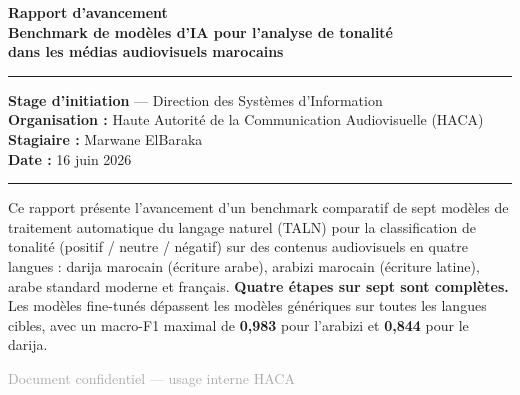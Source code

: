 \documentclass[12pt, a4paper]{article}
\begin{document}
\begin{titlepage}
  \centering
  \vspace*{1.5cm}

  {\LARGE\bfseries\color{hacablue}
    Rapport d'avancement\\[0.4em]
    \large Benchmark de modèles d'IA pour l'analyse de tonalité\\
    dans les médias audiovisuels marocains
  }\par

  \vspace{1.2cm}
  \rule{0.6\linewidth}{1pt}\par
  \vspace{0.6cm}

  {\large
    \textbf{Stage d'initiation} — Direction des Systèmes d'Information\\[0.3em]
    \textbf{Organisation :} Haute Autorité de la Communication Audiovisuelle (HACA)\\[0.3em]
    \textbf{Stagiaire :} Marwane ElBaraka\\[0.3em]
    \textbf{Date :} 16 juin 2026
  }\par

  \vspace{1.2cm}
  \rule{0.6\linewidth}{1pt}\par
  \vspace{1.5cm}

  \begin{infobox}
    Ce rapport présente l'avancement d'un benchmark comparatif de sept modèles
    de traitement automatique du langage naturel (TALN) pour la classification
    de tonalité (positif / neutre / négatif) sur des contenus audiovisuels en
    quatre langues : darija marocain (écriture arabe), arabizi marocain (écriture
    latine), arabe standard moderne et français. \textbf{Quatre étapes sur sept
    sont complètes.} Les modèles fine-tunés dépassent les modèles génériques sur
    toutes les langues cibles, avec un macro-F1 maximal de \textbf{0{,}983} pour
    l'arabizi et \textbf{0{,}844} pour le darija.
  \end{infobox}

  \vfill
  {\small\textcolor{darkgray}{Document confidentiel — usage interne HACA}}
\end{titlepage}

\tableofcontents
\newpage

\end{document}
